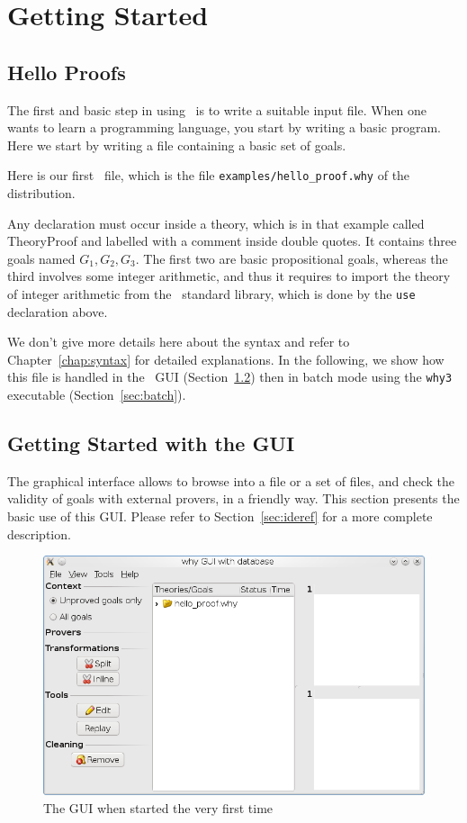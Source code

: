 \chapter{Getting Started}
\label{chap:starting}

\section{Hello Proofs}

The first and basic step in using \why\ is to write a suitable input
file. When one wants to learn a programming language, you start by
writing a basic program. Here we start by writing a file containing a
basic set of goals. 

Here is our first \why\ file, which is the file
\texttt{examples/hello\_proof.why} of the distribution.


Any declaration must occur
inside a theory, which is in that example called TheoryProof and
labelled with a comment inside double quotes. It contains three goals
named $G_1,G_2,G_3$. The first two are basic propositional goals,
whereas the third involves some integer arithmetic, and thus it
requires to import the theory of integer arithmetic from the \why\
standard library, which is done by the \texttt{use} declaration above.

We don't give more details here about the syntax and refer to
Chapter~\ref{chap:syntax} for detailed explanations. In the following,
we show how this file is handled in the \why\ GUI
(Section~\ref{sec:gui}) then in batch mode using the \texttt{why3}
executable (Section~\ref{sec:batch}). 


\section{Getting Started with the GUI}
\label{sec:gui}

The graphical interface allows to browse into a file or a set of
files, and check the validity of goals with external provers, in a
friendly way. This section presents the basic use of this GUI. Please
refer to Section~\ref{sec:ideref} for a more complete description.

\begin{figure}[tbp]
  \includegraphics[width=\textwidth]{gui1.png}
  \caption{The GUI when started the very first time}
  \label{fig:gui1}
\end{figure}

